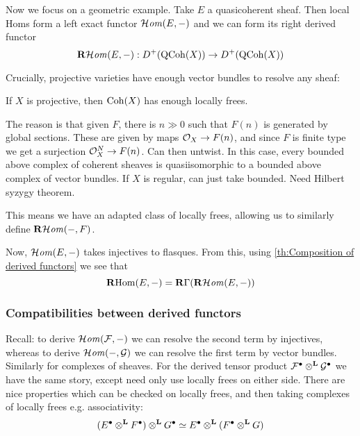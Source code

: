 Now we focus on a geometric example. Take $E$ a quasicoherent sheaf. Then local Homs form a left exact functor $\operatorname{\mathcal{H}\mathit{om}}(E,-)$ and we can form its right derived functor
\begin{equation*}
    \operatorname{\mathbf{R}\mathcal{H}\mathit{om}}(E,-):D^+(\operatorname{QCoh}(X))\to D^+(\operatorname{QCoh}(X))
\end{equation*}

Crucially, projective varieties have enough vector bundles to resolve any sheaf:

\begin{proposition}{}{}
    If $X$ is projective, then $\operatorname{Coh}(X)$ has enough locally frees.
\end{proposition}

The reason is that given $F$, there is $n\gg0$ such that $F(n)$ is generated by global sections. These are given by maps $\mathcal{O}_X\to F(n)$, and since $F$ is finite type we get a surjection $\mathcal{O}_X^N\to F(n)$. Can then untwist. In this case, every bounded above complex of coherent sheaves is quasiisomorphic to a bounded above complex of vector bundles. If $X$ is regular, can just take bounded. Need Hilbert syzygy theorem.

This means we have an adapted class of locally frees, allowing us to similarly
define $\operatorname{\mathbf{R}\mathcal{H}\mathit{om}}(-,F)$.

Now, $\operatorname{\mathcal{H}\mathit{om}}(E,-)$ takes injectives to flasques. From this, using \ref{th:Composition of derived functors} we see that
\begin{equation*}
    \operatorname{\mathbf{R} Hom}(E,-)=\operatorname{\mathbf{R}\Gamma}(\operatorname{\mathbf{R}\mathcal{H}\mathit{om}}(E,-))
\end{equation*}



\subsubsection{Compatibilities between derived functors}

Recall: to derive $\operatorname{\mathcal{H}\mathit{om}}(\mathcal{F}, -)$ we can resolve the second term by injectives, whereas to derive $\operatorname{\mathcal{H}\mathit{om}}(-,\mathcal{G})$ we can resolve the first term by vector bundles. Similarly for complexes of sheaves. For the derived tensor product $\mathcal{F}^\bullet\otimes^{\mathbf{L}}\mathcal{G}^\bullet$ we have the same story, except need only use locally frees on either side. There are nice properties which can be checked on locally frees, and then taking complexes of locally frees e.g. associativity: $$(E^\bullet\otimes^{\mathbf{L}} F^\bullet)\otimes^{\mathbf{L}} G^\bullet \simeq E^\bullet\otimes^{\mathbf{L}}(F^\bullet\otimes^{\mathbf{L}} G)$$

